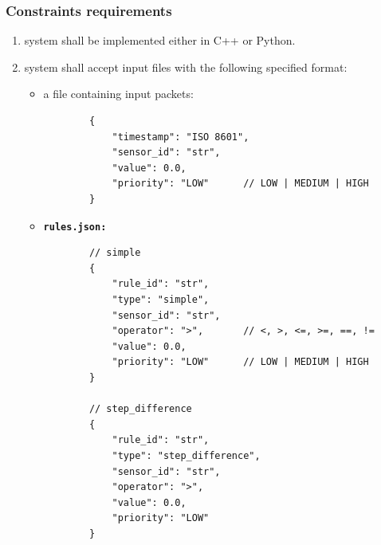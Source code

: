 \documentclass[11pt, a4paper]{article}
\begin{document}
\subsubsection{Constraints requirements}
\begin{enumerate}[label=\textbf{CR-\arabic*:}, align=left, leftmargin=2cm]
    \item system shall be implemented either in C++ or Python.
    \item system shall accept input files with the following specified format:
    \begin{itemize}[leftmargin=0cm]
        \item a file containing input packets:
        \begin{verbatim}
        {
            "timestamp": "ISO 8601",
            "sensor_id": "str",
            "value": 0.0,
            "priority": "LOW"      // LOW | MEDIUM | HIGH
        }
        \end{verbatim}
        \item \textbf{\texttt{rules.json:}}
        \begin{verbatim}
        // simple
        {
            "rule_id": "str",
            "type": "simple",
            "sensor_id": "str",
            "operator": ">",       // <, >, <=, >=, ==, !=
            "value": 0.0,
            "priority": "LOW"      // LOW | MEDIUM | HIGH
        }

        // step_difference
        {
            "rule_id": "str",
            "type": "step_difference",
            "sensor_id": "str",
            "operator": ">",
            "value": 0.0,
            "priority": "LOW"
        }


\end{verbatim}
\end{itemize}
\end{enumerate}
\end{document}
